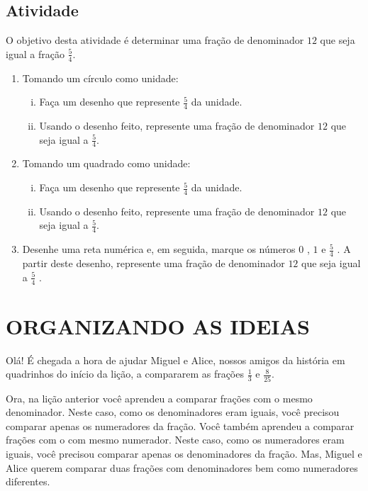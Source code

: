 \documentclass[a4,12pt]{book}
\begin{document}
\subsection{Atividade}

O objetivo desta atividade é determinar uma fração de denominador $12$ que seja igual a fração $\frac{5}{4}$.

\begin{enumerate} [\quad a)] %
  \item     Tomando um círculo como unidade: 
\begin{enumerate}[(i)]
  \item Faça um desenho que represente     $\frac{5}{4}$     da unidade.
  \item Usando o desenho feito, represente uma fração de denominador     $12$     que seja igual a     $\frac{5}{4}$.
\end{enumerate}  
  \item     Tomando um quadrado como unidade:
  \begin{enumerate}[(i)]
  \item Faça um desenho que represente     $\frac{5}{4}$     da unidade.
  \item Usando o desenho feito, represente uma fração de denominador     $12$     que seja igual a     $\frac{5}{4}$.
  \end{enumerate}
\item     Desenhe uma reta numérica e, em seguida, marque os números     $0$    ,     $1$     e     $\frac{5}{4}$    . A partir deste desenho, represente uma fração de denominador     $12$     que seja igual a     $\frac{5}{4}$    . 
\end{enumerate} %

\section{ORGANIZANDO AS IDEIAS }

Olá! É chegada a hora de ajudar Miguel e Alice, nossos amigos da história em quadrinhos do início da lição, a compararem as frações $\frac{1}{3}$ e $\frac{8}{25}$.

Ora, na lição anterior você aprendeu a comparar frações com o mesmo denominador. Neste caso, como os denominadores eram iguais, você precisou comparar apenas os numeradores da fração. Você também aprendeu a comparar frações com o com mesmo numerador. Neste caso, como os numeradores eram iguais, você precisou comparar apenas os denominadores da fração. Mas, Miguel e Alice querem comparar duas frações com denominadores bem como numeradores diferentes.
\end{document}
